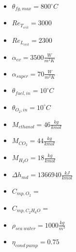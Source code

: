 \documentclass{article}
\begin{document}
	\begin{itemize}
		\item $\theta_{fg,max} = 800 ^\circ C$
		\item $Re_{T_{crit}} = 3000$
		\item $Re_{L_{crit}} = 2300$
		\item $\alpha_{ev} = 3500 \frac{W}{m^2K}$
		\item $\alpha_{super} = 70 \frac{W}{m^2K}$
		\item $\theta_{fuel,in} = 10 ^\circ C$
		\item $\theta_{O_2,in} = 10 ^\circ C$
		\item $M_{ethanol} = 46 \frac{kg}{kmol}$
		\item $M_{CO_2} = 44 \frac{kg}{kmol}$
		\item $M_{H_2O} = 18 \frac{kg}{kmol}$
		\item $\Delta h_{md} = 1366940 \frac{kJ}{kmol}$
		\item $C_{mp,O_2}  = $
		\item $C_{mp,C_2H_6O} = $
		\item $\rho_{sea\ water} = 1000 \frac{kg}{m^3}$
		\item $\eta_{cond\ pump} = 0.75$
	\end{itemize}
		
\end{document}
